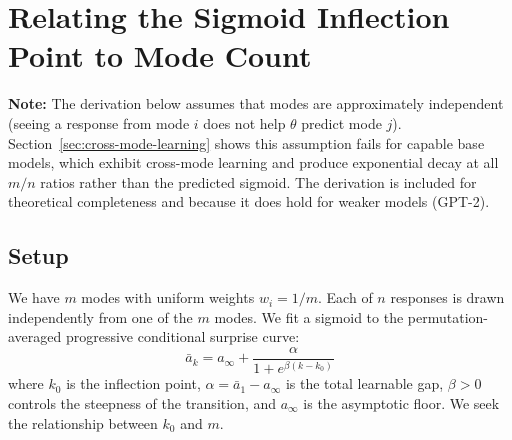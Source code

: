 %
%

\section{Relating the Sigmoid Inflection Point to Mode Count}\label{app:k0-derivation}

\textbf{Note:} The derivation below assumes that modes are approximately independent (seeing a response from mode $i$ does not help $\theta$ predict mode $j$).
Section~\ref{sec:cross-mode-learning} shows this assumption fails for capable base models, which exhibit cross-mode learning and produce exponential decay at all $m/n$ ratios rather than the predicted sigmoid.
The derivation is included for theoretical completeness and because it does hold for weaker models (GPT-2).

\subsection{Setup}

We have $m$ modes with uniform weights $w_i = 1/m$.
Each of $n$ responses is drawn independently from one of the $m$ modes.
We fit a sigmoid to the permutation-averaged progressive conditional surprise curve:
\begin{equation}
    \bar{a}_k = a_\infty + \frac{\alpha}{1 + e^{\beta(k - k_0)}}
\end{equation}
where $k_0$ is the inflection point, $\alpha = \bar{a}_1 - a_\infty$ is the total learnable gap, $\beta > 0$ controls the steepness of the transition, and $a_\infty$ is the asymptotic floor.
We seek the relationship between $k_0$ and $m$.

